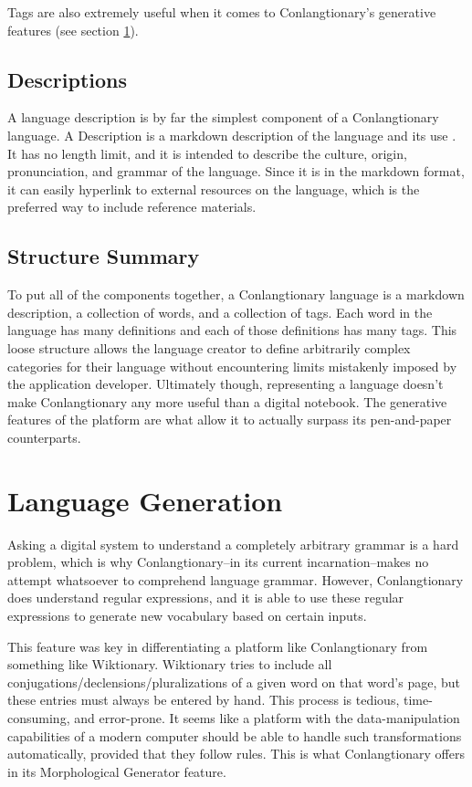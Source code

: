 Tags are also extremely useful when it comes to Conlangtionary's generative features (see section \ref{sec:language-generation}).

\subsection{Descriptions}
\label{subsec:descriptions}

A language description is by far the simplest component of a Conlangtionary language. A Description is a markdown description of the language and its use \cite{Markdown}. It has no length limit, and it is intended to describe the culture, origin, pronunciation, and grammar of the language. Since it is in the markdown format, it can easily hyperlink to external resources on the language, which is the preferred way to include reference materials.

\subsection{Structure Summary}
\label{subsec:structure-summary}

To put all of the components together, a Conlangtionary language is a markdown description, a collection of words, and a collection of tags. Each word in the language has many definitions and each of those definitions has many tags. This loose structure allows the language creator to define arbitrarily complex categories for their language without encountering limits mistakenly imposed by the application developer. Ultimately though, representing a language doesn't make Conlangtionary any more useful than a digital notebook. The generative features of the platform are what allow it to actually surpass its pen-and-paper counterparts.

\section{Language Generation}
\label{sec:language-generation}

Asking a digital system to understand a completely arbitrary grammar is a hard problem, which is why Conlangtionary--in its current incarnation--makes no attempt whatsoever to comprehend language grammar. However, Conlangtionary does understand regular expressions, and it is able to use these regular expressions to generate new vocabulary based on certain inputs.

This feature was key in differentiating a platform like Conlangtionary from something like Wiktionary. Wiktionary tries to include all conjugations/declensions/pluralizations of a given word on that word's page, but these entries must always be entered by hand. This process is tedious, time-consuming, and error-prone. It seems like a platform with the data-manipulation capabilities of a modern computer should be able to handle such transformations automatically, provided that they follow rules. This is what Conlangtionary offers in its Morphological Generator feature.

